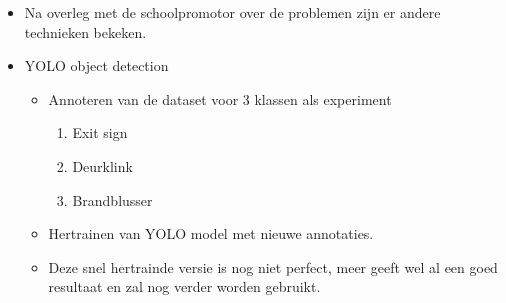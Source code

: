 \documentclass[11pt,a4paper]{article}
\begin{document}
\begin{itemize}
            \item Na overleg met de schoolpromotor over de problemen zijn er andere technieken bekeken.
            \item YOLO object detection~\cite{7780460}
            \begin{itemize}
                \item Annoteren van de dataset voor 3 klassen als experiment
                \begin{enumerate}
                    \item Exit sign
                    \item Deurklink
                    \item Brandblusser
                \end{enumerate}

                \item Hertrainen van YOLO model met nieuwe annotaties.
                \item Deze snel hertrainde versie is nog niet perfect, meer geeft wel al een goed resultaat en zal nog verder worden gebruikt.
            \end{itemize}
        \end{itemize}
\end{document}
